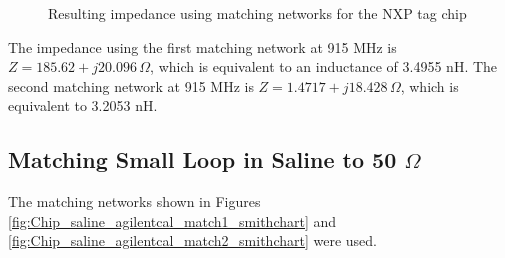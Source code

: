 \documentclass[12pt,onecolumn,titlepage]{article}
\begin{document}
\begin{figure}[h!]
	\centering
	\label{fig:Chip_saline_agilentcal_match_smithchart}
	\caption{Resulting impedance using matching networks for the NXP tag chip}
\end{figure}

The impedance using the first matching network at 915 MHz is $Z=185.62+j20.096 \, \Omega$, which is equivalent to an inductance of 3.4955 nH. The second matching network at 915 MHz is $Z=1.4717+j18.428 \, \Omega$, which is equivalent to 3.2053 nH.



\subsection{Matching Small Loop in Saline to 50 $\Omega$}
\indent \indent The matching networks shown in Figures \ref{fig:Chip_saline_agilentcal_match1_smithchart} and \ref{fig:Chip_saline_agilentcal_match2_smithchart} were used.
\end{document}
